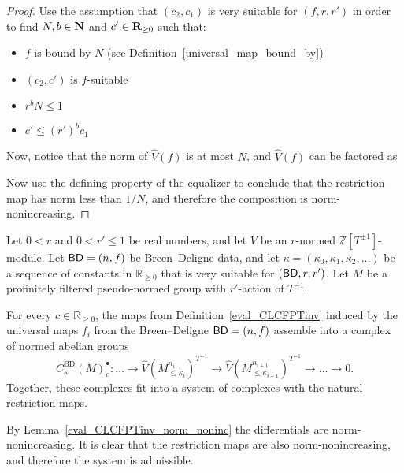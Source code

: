 \begin{proof}
  \leanok
  Use the assumption that $(c_2, c_1)$ is very suitable for $(f, r, r')$
  in order to find $N, b \in \mathbf{N}$ and $c' \in \mathbf{R}_{\ge 0}$ such that:
  \begin{itemize}
    \item $f$ is bound by $N$ (see Definition~\ref{universal_map_bound_by})
    \item $(c_2, c')$ is $f$-suitable
    \item $r ^ b N ≤ 1$
    \item $c' ≤ (r') ^ b c_1$
  \end{itemize}
  Now, notice that the norm of $\hat V(f)$ is at most $N$,
  and $\hat V(f)$ can be factored as
  \begin{center}
  \end{center}
  Now use the defining property of the equalizer to conclude that
  the restriction map has norm less than $1/N$,
  and therefore the composition is norm-nonincreasing.
\end{proof}

\begin{definition}
  \label{BD_system}
  \leanok
  Let $0 < r$ and $0 < r' \le 1$ be real numbers,
  and let $V$ be an $r$-normed $\mathbb Z[T^{\pm 1}]$-module.
  Let $\mathsf{BD} = (n,f)$ be Breen--Deligne data,
  and let $\kappa = (\kappa_0, \kappa_1, \kappa_2, \dots)$
  be a sequence of constants in $\mathbb R_{\ge 0}$
  that is very suitable for $(\mathsf{BD}, r, r')$.
  Let $M$ be a profinitely filtered pseudo-normed group with $r'$-action of $T^{-1}$.

  For every $c \in \mathbb R_{\ge 0}$,
  the maps from Definition~\ref{eval_CLCFPTinv}
  induced by the universal maps $f_i$ from the Breen--Deligne $\mathsf{BD} = (n,f)$
  assemble into a complex of normed abelian groups
  \[
    C^{\text{BD}}_{\kappa}(M)_c^\bullet \colon
    \dots \to
    \hat V(M_{\le \kappa_i}^{n_i})^{T^{-1}}
    \to
    \hat V(M_{\le \kappa_{i+1}}^{n_{i+1}})^{T^{-1}}
    \to \dots \to 0.
  \]
  Together, these complexes fit into a system of complexes
  with the natural restriction maps.

  By Lemma~\ref{eval_CLCFPTinv_norm_noninc} the differentials are norm-nonincreasing.
  It is clear that the restriction maps are also norm-nonincreasing,
  and therefore the system is admissible.
\end{definition}

